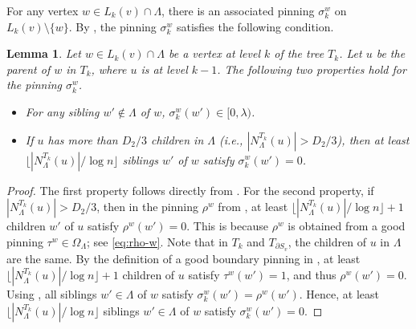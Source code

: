 \documentclass[11pt]{amsart}
\newcommand{\nbd}[2]{N_{#1}^{#2}}
\newtheorem{lemma}[theorem]{Lemma}
\theoremstyle{definition}
\theoremstyle{remark}
\begin{document}
For any vertex $w \in L_k(v) \cap \Lambda$, there is an associated pinning $\sigma^w_k$ on $L_k(v) \setminus \{w\}$. By , the pinning $\sigma^w_k$ satisfies the following condition.
\begin{lemma}\label{lemma:property-of-pinning-sigma^w_k}
Let $w \in L_k(v) \cap \Lambda$ be a vertex at level $k$ of the tree $T_k$. Let $u$ be the parent of $w$ in $T_k$, where $u$ is at level $k-1$.
The following two properties hold for the pinning $\sigma^w_k$.
\begin{itemize}
    \item For any sibling $w' \notin \Lambda$ of $w$, $\sigma^w_k(w') \in [0,\lambda)$.
    \item If $u$ has more than $D_2/3$ children in $\Lambda$ (i.e., $|\nbd{\Lambda}{T_k}(u)| > D_2 / 3$), then at least $\lfloor |N^{T_k}_\Lambda(u)|/\log n \rfloor$ siblings $w'$ of $w$ satisfy $\sigma^w_k(w') = 0$.
\end{itemize}
\end{lemma}
\begin{proof}
The first property follows directly from . For the second property, if $|\nbd{\Lambda}{T_k}(u)| > D_2 / 3$, then in the pinning $\rho^w$ from , at least $\lfloor |N^{T_k}_\Lambda(u)|/ \log n \rfloor+1$ children $w'$ of $u$ satisfy $\rho^w(w') = 0$. This is because $\rho^w$ is obtained from a good pinning $\tau^w \in \Omega_\Lambda$; see \eqref{eq:rho-w}. 
Note that in $T_k$ and $T_{\partial S_v}$, the children of $u$ in $\Lambda$ are the same.
By the definition of a good boundary pinning in , at least $\lfloor |N^{T_k}_\Lambda(u)|/\log n \rfloor+1$ children of $u$ satisfy $\tau^w(w') = 1$, and thus $\rho^w(w') = 0$. Using , all siblings $w' \in \Lambda$ of $w$ satisfy $\sigma^w_k(w') = \rho^w(w')$. Hence, at least $\lfloor |N^{T_k}_\Lambda(u)|/\log n \rfloor$ siblings $w' \in \Lambda$ of $w$ satisfy $\sigma^w_k(w') = 0$.
\end{proof}
\end{document}
